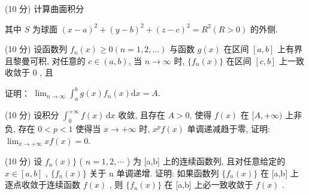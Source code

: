 (10 分) 计算曲面积分\par
\nopagebreak[4]
其中 $S$ 为球面 $(x - a)^2 + (y - b)^2 + (z - c)^2 = R^2 (R > 0)$ 的外侧.\par
\par{}
\par{}
(10 分) 设函数列 $f_n(x) \geq 0 (n = 1,2,\dots)$ 与函数 $g(x)$ 在区间 $[a,b]$ 上有界且黎曼可积, 对任意的 $c \in (a,b)$, 当 $n \to \infty$ 时, $\{f_n(x)\}$ 在区间 $[c,b]$ 上一致收敛于 0 , 且\par
\nopagebreak[4]
证明： $\lim_{n\to \infty}\int_a^b g(x)f_n(x)\mathrm{d}x = A.$\par
\par{}
(10 分) 设积分 $\int_{0}^{+\infty} f(x) \, \mathrm{d}x$ 收敛, 且存在 $A > 0$, 使得 $f(x)$ 在 $[A, +\infty)$ 上非负, 存在 $0 < p < 1$ 使得当 $x \to +\infty$ 时, $x^p f(x)$ 单调递减趋于零, 证明: $\lim_{x \to +\infty} x f(x) = 0$.\par
\par{}
(10 分) 设  $f_{n}(x)\}$  ( $n=1,2,\cdots$ ) 为 [a,b] 上的连续函数列, 且对任意给定的  $x\in[a,b]$ ,  $\{f_{n}(x)\}$  关于 n 单调递增. 证明: 如果函数列  $\{f_{n}(x)\}$  在 [a,b] 上逐点收敛于连续函数  $f(x)$ , 则  $\{f_{n}(x)\}$  在 [a,b] 上必一致收敛于  $f(x)$ .\par
